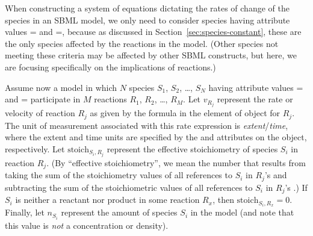 When constructing a system of equations dictating the rates of
change of the species in an SBML model, we only need to consider
species having attribute values = and
=, because as discussed in
Section~\ref{sec:species-constant}, these are the only species
affected by the reactions in the model.  (Other species not
meeting these criteria may be affected by other SBML constructs,
but here, we are focusing specifically on the implications of
reactions.)

\newcommand{\si}{\ensuremath{S_i}\xspace}
\newcommand{\nsi}{\ensuremath{n_{S_i}}\xspace}
\newcommand{\rj}{\ensuremath{R_j}\xspace}
\newcommand{\rx}{\ensuremath{R_x}\xspace}
\newcommand{\vrj}{\ensuremath{v_{R_j}}\xspace}
\newcommand{\stoichij}{\ensuremath{\textrm{stoich}_{S_{i},R_{j}}}\xspace}
\newcommand{\stoichix}{\ensuremath{\textrm{stoich}_{S_{i},R_{x}}}\xspace}
\newcommand{\csi}{\ensuremath{c_{S_i}}\xspace}
\newcommand{\csg}{\ensuremath{c_{\,\textrm{model}}}\xspace}

Assume now a model in which $N$ species $S_{1}$, $S_{2}$,
\ldots{}, $S_{N}$ having attribute values
= and
= participate in $M$ reactions
$R_{1}$, $R_{2}$, \ldots{}, $R_{M}$.  Let \vrj represent the rate
or velocity of reaction \rj as given by the formula in the
 element of \KineticLaw object for \rj.  The unit of
measurement associated with this rate expression is
\emph{extent}/\emph{time}, where the extent and time units are
specified by the  and 
attributes on the \Model object, respectively.  Let \stoichij
represent the effective stoichiometry of species \si in reaction
\rj.  (By ``effective stoichiometry'', we mean the number that
results from taking the sum of the stoichiometry values of all
references to \si in \rj's  and subtracting
the sum of the stoichiometric values of all references to \si in
\rj's .)  If \si is neither a reactant nor
product in some reaction \rx, then $\stoichix\!= 0$.  Finally, let
\nsi represent the amount of species \si in the model (and note
that this value is \emph{not} a concentration or density).

